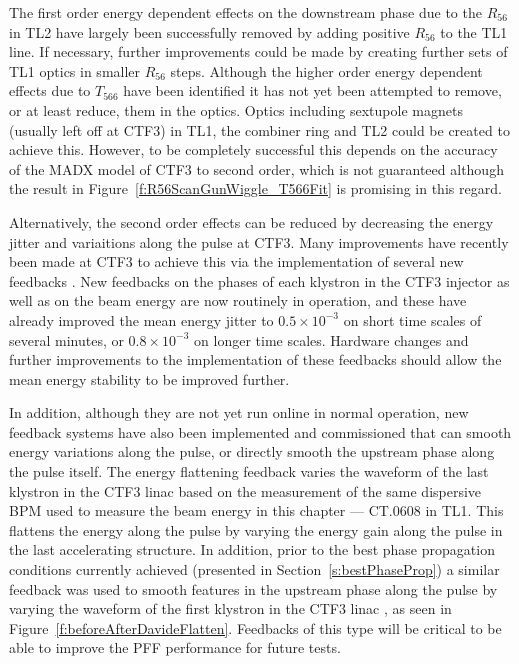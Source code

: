The first order energy dependent effects on the downstream phase due to the \(R_{56}\) in TL2 have largely been successfully removed by adding positive \(R_{56}\) to the TL1 line. If necessary, further improvements could be made by creating further sets of TL1 optics in smaller \(R_{56}\) steps. 
Although the higher order energy dependent effects due to \(T_{566}\) have been identified it has not yet been attempted to remove, or at least reduce, them in the optics. Optics including sextupole magnets (usually left off at CTF3) in TL1, the combiner ring and TL2 could be created to achieve this. However, to be completely successful this depends on the accuracy of the MADX model of CTF3 to second order, which is not guaranteed although the result in Figure~\ref{f:R56ScanGunWiggle_T566Fit} is promising in this regard.

Alternatively, the second order effects can be reduced by decreasing the energy jitter and variaitions along the pulse at CTF3. Many improvements have recently been made at CTF3 to achieve this via the implementation of several new feedbacks \cite{lukasIPAC16}. New feedbacks on the phases of each klystron in the CTF3 injector as well as on the beam energy are now routinely in operation, and these have already improved the mean energy jitter to \(0.5\times10^{-3}\) on short time scales of several minutes, or \(0.8\times10^{-3}\) on longer time scales. Hardware changes and further improvements to the implementation of these feedbacks should allow the mean energy stability to be improved further.

In addition, although they are not yet run online in normal operation, new feedback systems have also been implemented and commissioned that can smooth energy variations along the pulse, or directly smooth the upstream phase along the pulse itself. The energy flattening feedback \cite{tobiasPriv} varies the waveform of the last klystron in the CTF3 linac based on the measurement of the same dispersive BPM used to measure the beam energy in this chapter --- CT.0608 in TL1. This flattens the energy along the pulse by varying the energy gain along the pulse in the last accelerating structure. In addition, prior to the best phase propagation conditions currently achieved (presented in Section~\ref{s:bestPhaseProp}) a similar feedback was used to smooth features in the upstream phase along the pulse by varying the waveform of the first klystron in the CTF3 linac \cite{davideThesis}, as seen in Figure~\ref{f:beforeAfterDavideFlatten}. Feedbacks of this type will be critical to be able to improve the PFF performance for future tests.

